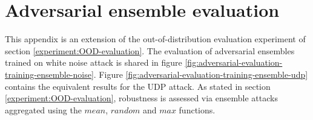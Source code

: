 
\appendix

\chapter{Adversarial ensemble evaluation} \label{appendix:adversarial-ensemble-plots}

This appendix is an extension of the out-of-distribution evaluation experiment of section \ref{experiment:OOD-evaluation}. The evaluation of adversarial ensembles trained on white noise attack is shared in figure \ref{fig:adversarial-evaluation-training-ensemble-noise}. Figure \ref{fig:adversarial-evaluation-training-ensemble-udp} contains the equivalent results for the UDP attack. As stated in section \ref{experiment:OOD-evaluation}, robustness is assessed via ensemble attacks aggregated using the $mean$, $random$ and $max$ functions.


